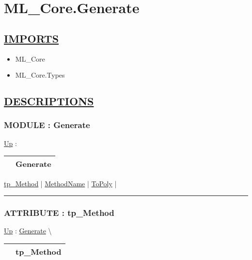 \chapter*{ML\_Core.Generate}
\hypertarget{ecldoc:toc:ML_Core.Generate}{}

\section*{\underline{IMPORTS}}
\begin{itemize}
\item ML\_Core
\item ML\_Core.Types
\end{itemize}

\section*{\underline{DESCRIPTIONS}}
\subsection*{MODULE : Generate}
\hypertarget{ecldoc:ML_Core.Generate}{}
\hyperlink{ecldoc:toc:ML_Core}{Up} :

{\renewcommand{\arraystretch}{1.5}
\begin{tabularx}{\textwidth}{|>{\raggedright\arraybackslash}l|X|}
\hline
\hspace{0pt} & Generate \\
\hline
\end{tabularx}
}

\par


\hyperlink{ecldoc:ecldoc-tp_Method}{tp\_Method}  |
\hyperlink{ecldoc:ml_core.generate.methodname}{MethodName}  |
\hyperlink{ecldoc:ml_core.generate.topoly}{ToPoly}  |

\rule{\linewidth}{0.5pt}

\subsection*{ATTRIBUTE : tp\_Method}
\hypertarget{ecldoc:ecldoc-tp_Method}{}
\hyperlink{ecldoc:ML_Core.Generate}{Up} :
\hspace{0pt} \hyperlink{ecldoc:ML_Core.Generate}{Generate} \textbackslash 

{\renewcommand{\arraystretch}{1.5}
\begin{tabularx}{\textwidth}{|>{\raggedright\arraybackslash}l|X|}
\hline
\hspace{0pt} & tp\_Method \\
\hline
\end{tabularx}
}


